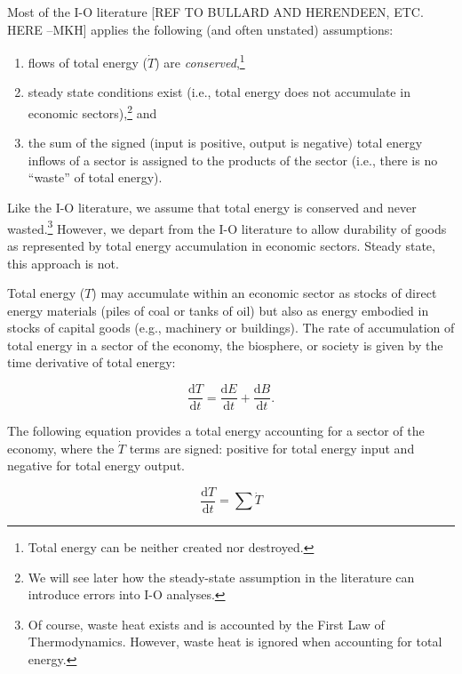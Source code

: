 Most of the I-O literature \cite{Bullard1975, Herendeen1978} 
[REF TO BULLARD AND HERENDEEN, ETC. HERE --MKH] 
applies the following (and often unstated) assumptions:

\begin{enumerate}
	\item flows of total energy ($\dot{T}$) are 
	\emph{conserved},\footnote{Total energy 
	can be neither created nor destroyed.}

	\item steady state conditions exist 
	(i.e., total energy does not accumulate in economic 
	sectors),\footnote{We will see later how the
	steady-state assumption in the literature 
	can introduce errors into I-O analyses.} and
	
	\item the sum of the signed 
	(input is positive, output is negative) 
	total energy inflows of a sector
	is assigned to the products of the sector (i.e., 
	there is no ``waste'' of total energy).
\end{enumerate}

Like the I-O literature, we assume that total energy is conserved
and never wasted.\footnote{Of course, waste heat exists and is
accounted by the First Law of Thermodynamics. However,
waste heat is ignored when accounting for total energy.}
However, we depart from the I-O literature to allow durability of goods 
as represented by total energy accumulation in economic sectors. 
Steady state, this approach is not. 

Total energy ($T$) may accumulate within an economic sector 
as stocks of direct energy materials 
(piles of coal or tanks of oil) 
but also as energy embodied in stocks of capital goods 
(e.g., machinery or buildings). 
The rate of accumulation of total energy 
in a sector of the economy, the biosphere, 
or society is given by the time derivative of total energy:

\begin{equation} \label{eq:T_accum_def}
	\frac{\mathrm{d}T}{\mathrm{d}t} 
	= \frac{\mathrm{d}E}{\mathrm{d}t} 
	+ \frac{\mathrm{d}B}{\mathrm{d}t}.
\end{equation}

The following equation provides a total energy accounting 
for a sector of the economy, where the $\dot{T}$ terms
are signed: positive for total energy input and negative
for total energy output.

\begin{equation} \label{eq:total_energy_accounting}
		\frac{\mathrm{d}T}{\mathrm{d}t}
		= \sum \dot{T}
\end{equation}

